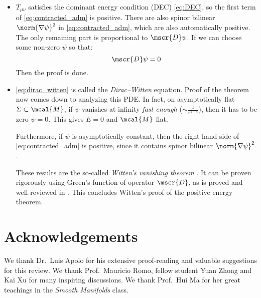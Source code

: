 \documentclass[a4paper,11pt]{article}
\begin{document}
\begin{itemize}[leftmargin=*]
	\item $T_{\mu\nu}$ satisfies the dominant energy condition (DEC) \eqref{eq:DEC}, so the first term of \eqref{eq:contracted_adm} is positive. There are also spinor bilinear $\norm{\nabla\psi}^2$ in \eqref{eq:contracted_adm}, which are also automatically positive. The only remaining part is proportional to $\mscr{D}\psi$. If we can choose some non-zero $\psi$ so that:
	\begin{equation}
		\mscr{D}\psi = 0
		\label{eq:dirac_witten}
	\end{equation}
	Then the proof is done. 
	\item \eqref{eq:dirac_witten} is called the \textit{Dirac--Witten} equation. Proof of the theorem now comes down to analyzing this PDE. In fact, on asymptotically flat $\Sigma\subset\mcal{M}$, if $\psi$ vanishes at infinity \textit{fast enough} ($\sim \frac{1}{r^{1-\epsilon}}$), then it has to be zero $\psi = 0$. This gives $E = 0$ and $\mcal{M}$ flat. 
	
	Furthermore, if $\psi$ is asymptotically constant, then the right-hand side of \eqref{eq:contracted_adm} is positive, since it contains spinor bilinear $\norm{\nabla\psi}^2$. 
	
	These results are the so-called \textit{Witten's vanishing theorem} \cite{Parker:1981uy}. It can be proven rigorously using Green's function of operator $\mscr{D}$, as is proved and well-reviewed in \cite{Witten:1981mf,Parker:1981uy}. This concludes Witten's proof of the positive energy theorem. 
	\end{itemize}
	
	\hfill\qedsymbol
\section{Acknowledgements}
	We thank Dr.~Luis Apolo for his extensive proof-reading and valuable suggestions for this review. We thank Prof.~Mauricio Romo, fellow student Yuan Zhong and Kai Xu for many inspiring discussions. We thank Prof.~Hui Ma for her great teachings in the \textit{Smooth Manifolds} class. 


\renewcommand*{\bibfont}{%
	\linespread{1.}\selectfont
}
\raggedright
\printbibliography[%
	title = {References} %
	,heading = bibintoc
]
\end{document}
